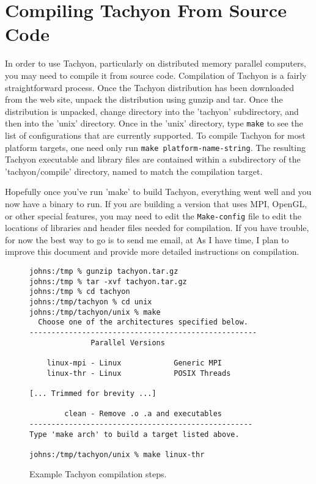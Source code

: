 \section{Compiling Tachyon From Source Code}
  In order to use Tachyon, particularly on distributed memory
parallel computers, you may need to compile it from source code.
Compilation of Tachyon is a fairly straightforward process.  
Once the Tachyon distribution has been downloaded from the 
web site, unpack the distribution using gunzip and tar.
Once the distribution is unpacked, change directory into the 
'tachyon' subdirectory, and then into the 'unix' directory.  
Once in the 'unix' directory, type {\tt make} to see the list of 
configurations that are currently supported.
To compile Tachyon for most platform targets, one need only run 
{\tt make platform-name-string}.  The resulting
Tachyon executable and library files are contained within a 
subdirectory of the 'tachyon/compile' directory, named to match
the compilation target.

Hopefully once you've run 'make' to build Tachyon, 
everything went well and you now have a binary to run.  If you are building
a version that uses MPI, OpenGL, or other special features,
you may need to edit the {\tt Make-config} file to edit the 
locations of libraries and header files needed for compilation.
If you have trouble, for now the best way to go is to send me email, at
{\em \EMAIL}  As I have time, I plan to improve this document and provide
more detailed instructions on compilation.

\begin{figure}[tb]
\begin{center}
\begin{lstlisting}
johns:/tmp % gunzip tachyon.tar.gz
johns:/tmp % tar -xvf tachyon.tar.gz
johns:/tmp % cd tachyon
johns:/tmp/tachyon % cd unix
johns:/tmp/tachyon/unix % make
  Choose one of the architectures specified below.
----------------------------------------------------
              Parallel Versions        

    linux-mpi - Linux            Generic MPI           
    linux-thr - Linux            POSIX Threads          

[... Trimmed for brevity ...]

        clean - Remove .o .a and executables
---------------------------------------------------
Type 'make arch' to build a target listed above.

johns:/tmp/tachyon/unix % make linux-thr
\end{lstlisting}
\end{center}
 \caption{Example Tachyon compilation steps.}
 \label{fig:perspcamera}
\end{figure}

